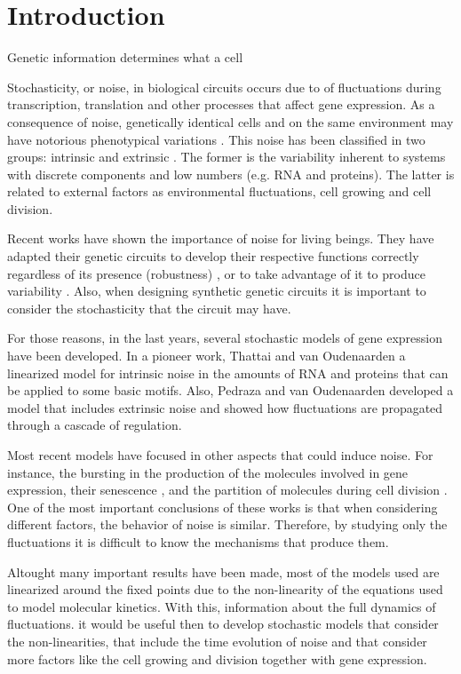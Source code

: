 \chapter*{Introduction}

Genetic information determines what a cell 


Stochasticity, or noise, in biological circuits occurs due to of fluctuations during transcription, translation \cite{kaern05} and other processes that affect gene expression. As a consequence of noise, genetically identical cells and on the same environment may have notorious phenotypical variations \cite{kaern05} \cite{elowitz02} \cite{pedraza05}. This noise has been classified in two groups: intrinsic and extrinsic \cite{elowitz02} \cite{paulsson05}. The former is the variability inherent to systems with discrete components and low numbers (e.g. RNA and proteins). The latter is related to external factors as environmental fluctuations, cell growing and cell division.

Recent works have shown the importance of noise for living beings. They have adapted their genetic circuits to develop their respective functions correctly regardless of its presence (robustness) \cite{alon99}, or to take advantage of it to produce variability \cite{arkin98}. Also, when designing synthetic genetic circuits it is important to consider the stochasticity that the circuit may have.

For those reasons, in the last years, several stochastic models of gene expression have been developed. In a pioneer work, Thattai and van Oudenaarden \cite{thattai01} a linearized model for intrinsic noise in the amounts of RNA and proteins that can be applied to some basic motifs. Also, Pedraza and van Oudenaarden \cite{pedraza05} developed a model that includes extrinsic noise and showed how fluctuations are propagated through a cascade of regulation.

Most recent models have focused in other aspects that could induce noise. For instance, the bursting in the production of the molecules involved in gene expression, their senescence \cite{pedraza08}, and the partition of molecules during cell division \cite{huh11a} \cite{huh11b}. One of the most important conclusions of these works is that when considering different factors, the behavior of noise is similar. Therefore, by studying only the fluctuations it is difficult to know the mechanisms that produce them.

Altought many important results have been made, most of the models used are linearized around the fixed points due to the non-linearity of the equations used to model molecular kinetics. With this, information about the full dynamics of fluctuations. it would be useful then to develop stochastic models that consider the non-linearities, that include the time evolution of noise and that consider more factors like the cell growing and division together with gene expression.
